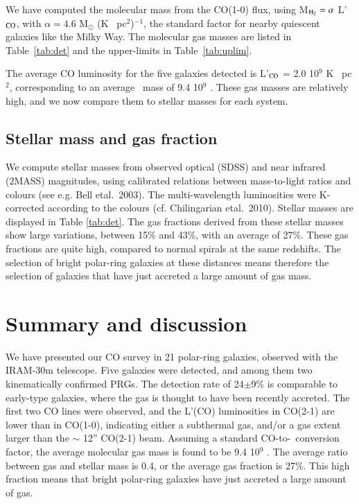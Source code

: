 \documentclass[traditabstract]{aa}
\def\hh     {\ifmmode{{\rm H}_2}\else{H$_2$}\fi}
\def\ts     {\thinspace}
\def\kms    {\ifmmode{{\rm \ts km\ts s}^{-1}}\else{\ts km\ts s$^{-1}$}\fi}
\def\msol   {\ifmmode{{\rm M}_{\odot}}\else{M$_{\odot}$}\fi}
\def\etal   {{\rm et\ts al.}~}
\begin{document}
We have computed the molecular mass from the CO(1-0) flux,
 using
M$_{\rm H_2} = \alpha$ L'$_{\rm CO}$, 
with $\alpha=4.6$ M$_\odot$ (K \kms\, pc$^2$)$^{-1}$,
the standard factor for nearby quiescent galaxies like the Milky Way. 
The molecular gas masses are
listed in Table~\ref{tab:det} and the upper-limits in  Table~\ref{tab:uplim}. 

The average CO luminosity for the five galaxies detected
is L'$_{\rm CO}$ = 2.0 10$^{9}$ K \kms\, pc$^2$, corresponding to an 
average \hh\, mass of  9.4 10$^{9}$ \msol.
These gas masses are relatively high, and we now compare
them to stellar masses for each system.

\subsection{Stellar mass and gas fraction}
\label{GFR}

We compute stellar masses from observed optical (SDSS) and near infrared
(2MASS) magnitudes, 
using calibrated relations between mass-to-light ratios and colours
(see e.g. Bell \etal 2003).  The multi-wavelength luminosities
were K-corrected according to the colours (cf. Chilingarian \etal 2010). 
Stellar masses are displayed in Table \ref{tab:det}.
The gas fractions derived from these
stellar masses show large variations, 
between 15\% and 43\%, with an average of 27\%. These gas fractions
are quite high, compared to normal spirals at the same redshifts.
The selection of bright polar-ring galaxies at these distances
means therefore the selection of galaxies that have just accreted a large amount of
gas mass.

\section{Summary and discussion}
\label{disc}

We have presented
 our CO survey in 21 polar-ring galaxies, observed with the IRAM-30m telescope. Five
galaxies were detected, and among them two kinematically confirmed PRGs.
The detection rate of 24$\pm$9\% is comparable to early-type galaxies, where the gas
is thought to have been recently accreted.
The first two CO lines were observed, and the L'(CO) luminosities in CO(2-1) are
lower than in CO(1-0), indicating either a subthermal gas, and/or a gas extent
larger than the $\sim$ 12'' CO(2-1) beam.
 Assuming a standard CO-to-\hh\, conversion factor, the average molecular gas
mass is found to be  9.4 10$^{9}$ \msol.
 The average ratio between gas and stellar mass is 0.4, or the average gas fraction
is 27\%. This high fraction means that bright polar-ring galaxies have just accreted
a large amount of gas.
\end{document}
